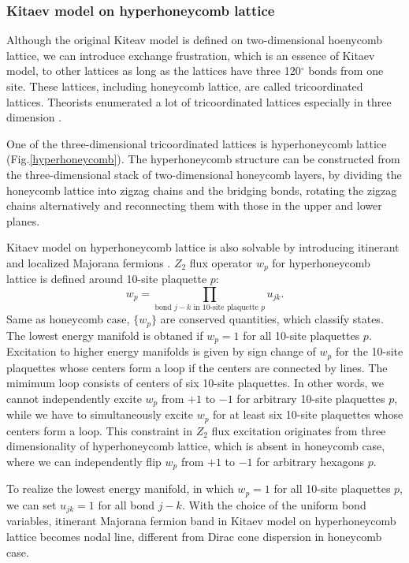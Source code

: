 \subsubsection{Kitaev model on hyperhoneycomb lattice}
Although the original Kiteav model is defined on two-dimensional hoenycomb lattice, we can introduce exchange frustration, which is an essence of Kitaev model, to other lattices as long as the lattices have three 120$^\circ$ bonds from one site.
These lattices, including honeycomb lattice, are called tricoordinated lattices.
Theorists enumerated a lot of tricoordinated lattices especially in three dimension \cite{o2016classification}.

One of the three-dimensional tricoordinated lattices is hyperhoneycomb lattice (Fig.\ref{hyperhoneycomb}).
The hyperhoneycomb structure can be constructed from the three-dimensional stack of two-dimensional honeycomb layers,
by dividing the honeycomb lattice into zigzag chains and the bridging bonds, rotating the zigzag chains alternatively and reconnecting them with those in the upper and lower planes.

Kitaev model on hyperhoneycomb lattice is also solvable by introducing itinerant and localized Majorana fermions \cite{mandal2009exactly}.
$Z_2$ flux operator $w_p$ for hyperhoneycomb lattice is defined around 10-site plaquette $p$:
\begin{equation}
  w_p = \prod_\text{bond $j-k$ in 10-site plaquette $p$}u_{jk}.
\end{equation}
Same as honeycomb case, $\{w_p\}$ are conserved quantities, which classify states.
The lowest energy manifold is obtaned if $w_p = 1$ for all 10-site plaquettes $p$.
Excitation to higher energy manifolds is given by sign change of $w_p$ for the 10-site plaquettes whose centers form a loop if the centers are connected by lines.
The mimimum loop consists of centers of six 10-site plaquettes.
In other words, we cannot independently excite $w_p$ from $+1$ to $-1$ for arbitrary 10-site plaquettes $p$, while we have to simultaneously excite $w_p$ for at least six 10-site plaquettes whose centers form a loop.
This constraint in $Z_2$ flux excitation originates from three dimensionality of hyperhoneycomb lattice, which is absent in honeycomb case, where we can independently flip $w_p$ from $+1$ to $-1$ for arbitrary hexagons $p$.

To realize the lowest energy manifold, in which $w_p = 1$ for all 10-site plaquettes $p$, we can set $u_{jk} = 1$ for all bond $j-k$.
With the choice of the uniform bond variables, itinerant Majorana fermion band in Kitaev model on hyperhoneycomb lattice becomes nodal line, different from Dirac cone dispersion in honeycomb case.

